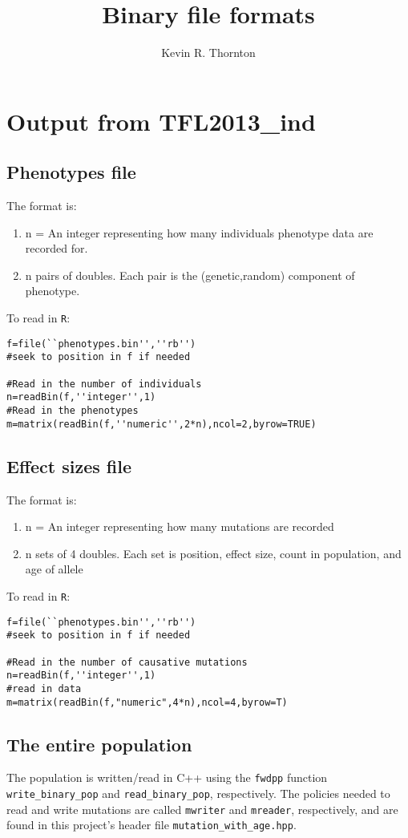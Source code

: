 \documentclass{article}
\author{Kevin R. Thornton}
\title{Binary file formats}
\begin{document}
\maketitle

\section*{Output from TFL2013\_ind}
\subsection*{Phenotypes file}
The format is:
\begin{enumerate}
\item n = An integer representing how many individuals phenotype data are recorded for.
\item n pairs of doubles.  Each pair is the (genetic,random) component of phenotype.
\end{enumerate}

To read in \texttt{R}:

\begin{lstlisting}
f=file(``phenotypes.bin'',''rb'')
#seek to position in f if needed

#Read in the number of individuals
n=readBin(f,''integer'',1)
#Read in the phenotypes
m=matrix(readBin(f,''numeric'',2*n),ncol=2,byrow=TRUE)
\end{lstlisting}

\subsection*{Effect sizes file}

The format is:
\begin{enumerate}
\item n = An integer representing how many mutations are recorded
\item n sets of 4 doubles.  Each set is position, effect size, count in population, and age of allele
\end{enumerate}

To read in \texttt{R}:
\begin{lstlisting}
f=file(``phenotypes.bin'',''rb'')
#seek to position in f if needed

#Read in the number of causative mutations
n=readBin(f,''integer'',1)
#read in data
m=matrix(readBin(f,"numeric",4*n),ncol=4,byrow=T)
\end{lstlisting}

\subsection*{The entire population}
The population is written/read in C++ using the \texttt{fwdpp} function \texttt{write\_binary\_pop} and \texttt{read\_binary\_pop}, respectively.  The policies needed to read and write mutations are called \texttt{mwriter} and \texttt{mreader}, respectively, and are found in this project's header file \texttt{mutation\_with\_age.hpp}.
\end{document}
